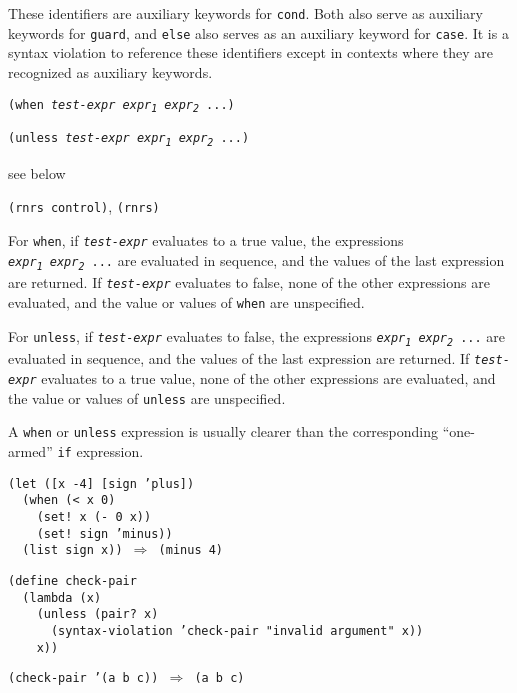 These identifiers are auxiliary keywords for \texttt{cond}.
Both also serve as auxiliary keywords for \texttt{guard}, and
\texttt{else} also serves as an auxiliary keyword for \texttt{case}.
It is a syntax violation to reference these identifiers except in
contexts where they are recognized as auxiliary keywords.


\begin{description}

\label{control_s17}\item[syntax] \texttt{(when \textit{test-expr} \textit{expr\textsubscript{1}} \textit{expr\textsubscript{2}} ...)}



\item[syntax] \texttt{(unless \textit{test-expr} \textit{expr\textsubscript{1}} \textit{expr\textsubscript{2}} ...)}



\item[returns] see below


\item[libraries] \texttt{(rnrs control)}, \texttt{(rnrs)}
\end{description}


For \texttt{when},
if \texttt{\textit{test-expr}} evaluates to a true value, the expressions
\texttt{\textit{expr\textsubscript{1}} \textit{expr\textsubscript{2}} ...} are evaluated in sequence,
and the values of the last expression are returned.
If \texttt{\textit{test-expr}} evaluates to false, none of the other expressions
are evaluated, and the value or values of \texttt{when} are unspecified.


For \texttt{unless},
if \texttt{\textit{test-expr}} evaluates to false, the expressions
\texttt{\textit{expr\textsubscript{1}} \textit{expr\textsubscript{2}} ...} are evaluated in sequence,
and the values of the last expression are returned.
If \texttt{\textit{test-expr}} evaluates to a true value, none of the other
expressions are evaluated, and the value or values of \texttt{unless} are unspecified.


A \texttt{when} or \texttt{unless} expression is usually clearer than
the corresponding ``one-armed'' \texttt{if} expression.


\begin{alltt}
(let ([x -4] [sign 'plus])
  (when (\textless{} x 0)
    (set! x (- 0 x))
    (set! sign 'minus))
  (list sign x)) \(\Rightarrow\) (minus 4)

(define check-pair
  (lambda (x)
    (unless (pair? x)
      (syntax-violation 'check-pair "invalid argument" x))
    x))

(check-pair '(a b c)) \(\Rightarrow\) (a b c)
\end{alltt}

